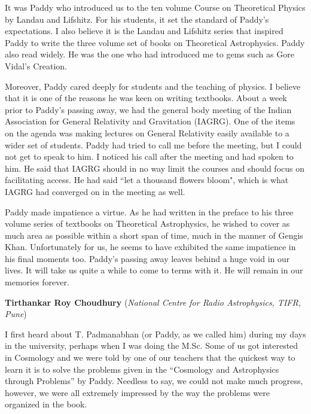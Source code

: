 \documentclass[prd, preprint, longbibliography, 12pt]{revtex4-2}
\begin{document}
It was Paddy who introduced us to the ten volume Course on Theoretical Physics 
by Landau and Lifshitz. 
For his students, it set the standard of Paddy's expectations. 
I also believe it is the Landau and Lifshitz series that inspired Paddy 
to write  the three volume set of books on Theoretical Astrophysics.
Paddy also read widely. 
He was the one who had introduced me to gems such as Gore Vidal's Creation.

Moreover, Paddy cared deeply for students and the teaching of physics. 
I believe that it is one of the reasons he was keen on writing textbooks. 
About a week prior to Paddy's passing away, we had the general body meeting 
of the Indian Association for General Relativity and Gravitation (IAGRG). 
One of the items on the agenda was making lectures on General Relativity 
easily available to a wider set of students. 
Paddy had tried to call me before the meeting, but I could not get to speak 
to him. 
I noticed his call after the meeting and had spoken to him. 
He said that IAGRG should in no way limit the courses and should focus on 
facilitating access. 
He had said ``let a thousand flowers bloom", which is what IAGRG had converged 
on in the meeting as well.

Paddy made impatience a virtue. 
As he had written in the preface to his three volume series of textbooks on 
Theoretical Astrophysics, he wished to cover as much area as possible within
a short span of time, much in the manner of Gengis Khan. 
Unfortunately for us, he seems to have exhibited the same impatience in his 
final moments too.
Paddy's passing away leaves behind a huge void in our lives. 
It will take us quite a while to come to terms with it. 
He will remain in our memories forever.

\bigskip

\bigskip

\newpage

\centerline{{\bf Tirthankar Roy Choudhury} ({\it National Centre for Radio Astrophysics, TIFR, Pune})}

\medskip

\noindent I first heard about T. Padmanabhan (or Paddy, as we called him) during my days in the university, perhaps when I was doing the M.Sc. Some of us got interested in Cosmology and we were told by one of our teachers that the quickest way to learn it is to solve the problems given in the “Cosmology and Astrophysics through Problems” by Paddy. Needless to say, we could not make much progress, however, we were all extremely impressed by the way the problems were organized in the book.
\end{document}
